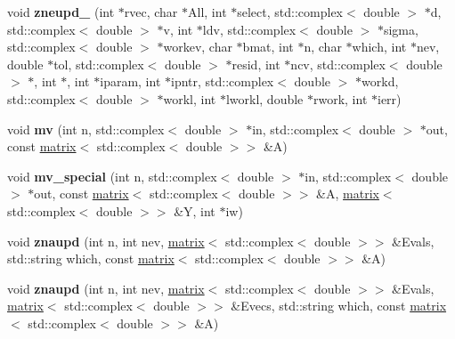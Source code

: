 \begin{DoxyCompactItemize}
\item 
\hypertarget{namespacekeycpp_af1b4572567168166e84ec6ed3eae0191}{void {\bfseries zneupd\-\_\-} (int $\ast$rvec, char $\ast$All, int $\ast$select, std\-::complex$<$ double $>$ $\ast$d, std\-::complex$<$ double $>$ $\ast$v, int $\ast$ldv, std\-::complex$<$ double $>$ $\ast$sigma, std\-::complex$<$ double $>$ $\ast$workev, char $\ast$bmat, int $\ast$n, char $\ast$which, int $\ast$nev, double $\ast$tol, std\-::complex$<$ double $>$ $\ast$resid, int $\ast$ncv, std\-::complex$<$ double $>$ $\ast$, int $\ast$, int $\ast$iparam, int $\ast$ipntr, std\-::complex$<$ double $>$ $\ast$workd, std\-::complex$<$ double $>$ $\ast$workl, int $\ast$lworkl, double $\ast$rwork, int $\ast$ierr)}\label{namespacekeycpp_af1b4572567168166e84ec6ed3eae0191}

\item 
\hypertarget{namespacekeycpp_a5794468c104a7539534c626147ae057f}{void {\bfseries mv} (int n, std\-::complex$<$ double $>$ $\ast$in, std\-::complex$<$ double $>$ $\ast$out, const \hyperlink{classkeycpp_1_1matrix}{matrix}$<$ std\-::complex$<$ double $>$$>$ \&A)}\label{namespacekeycpp_a5794468c104a7539534c626147ae057f}

\item 
\hypertarget{namespacekeycpp_adbe452cbd5260ac6506b4e3183648ea5}{void {\bfseries mv\-\_\-special} (int n, std\-::complex$<$ double $>$ $\ast$in, std\-::complex$<$ double $>$ $\ast$out, const \hyperlink{classkeycpp_1_1matrix}{matrix}$<$ std\-::complex$<$ double $>$$>$ \&A, \hyperlink{classkeycpp_1_1matrix}{matrix}$<$ std\-::complex$<$ double $>$$>$ \&Y, int $\ast$iw)}\label{namespacekeycpp_adbe452cbd5260ac6506b4e3183648ea5}

\item 
\hypertarget{namespacekeycpp_a456d28ae263f8e6d1ff7e991631ead1d}{void {\bfseries znaupd} (int n, int nev, \hyperlink{classkeycpp_1_1matrix}{matrix}$<$ std\-::complex$<$ double $>$$>$ \&Evals, std\-::string which, const \hyperlink{classkeycpp_1_1matrix}{matrix}$<$ std\-::complex$<$ double $>$$>$ \&A)}\label{namespacekeycpp_a456d28ae263f8e6d1ff7e991631ead1d}

\item 
\hypertarget{namespacekeycpp_a7c7ec79c7639fd54fb2ac13ab2044158}{void {\bfseries znaupd} (int n, int nev, \hyperlink{classkeycpp_1_1matrix}{matrix}$<$ std\-::complex$<$ double $>$$>$ \&Evals, \hyperlink{classkeycpp_1_1matrix}{matrix}$<$ std\-::complex$<$ double $>$$>$ \&Evecs, std\-::string which, const \hyperlink{classkeycpp_1_1matrix}{matrix}$<$ std\-::complex$<$ double $>$$>$ \&A)}\label{namespacekeycpp_a7c7ec79c7639fd54fb2ac13ab2044158}


\end{DoxyCompactItemize}
